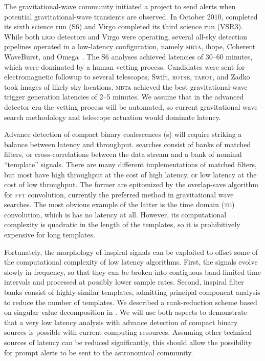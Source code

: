  The gravitational-wave community
initiated a project to send alerts when potential gravitational-wave transients
are observed.  In October 2010, \LIGO{} completed its sixth science run
(S6) and Virgo completed its third science run (VSR3).  While both
\textsc{ligo} detectors and Virgo were operating, several all-sky detection
pipelines operated in a low-latency configuration, namely \textsc{mbta}, ihope,
Coherent WaveBurst, and Omega~\cite{HugheyGWPAW2011, S6lowlatency}.
 The S6 analyses
achieved latencies of 30--60 minutes, which were dominated by a human vetting
process. Candidates were sent for electromagnetic followup to several
telescopes; Swift, \textsc{rotse}, \textsc{tarot}, and Zadko~\cite{kanner2008,
HugheyGWPAW2011} took images of likely sky locations.  \textsc{mbta} achieved
the best gravitational-wave trigger generation latencies of 2--5 minutes.  We
assume that in the advanced detector era the vetting process will be automated,
so current gravitational wave search methodology and telescope actuation would
dominate latency.

Advance detection of compact binary coalescences (\CBC{}s) will require striking a balance between latency
and throughput.  \CBC{} searches consist of banks of matched filters, or
cross-correlations between the data stream and a bank of nominal ``template''
signals.  There are many different implementations of matched filters, but most
have high throughput at the cost of high latency, or low latency at the cost of
low throughput.  The former are epitomized by the overlap-save algorithm for
\textsc{fft} convolution, currently the preferred method in gravitational wave
searches.  The most obvious example of the latter is the time domain
(\textsc{td}) convolution, which is has no latency at all.  However, its
computational complexity is quadratic in the length of the templates, so it is
prohibitively expensive for long templates.

Fortunately, the morphology of inspiral signals can be exploited to offset some
of the computational complexity of low latency algorithms.  First, the signals
evolve slowly in frequency, so that they can be broken into contiguous
band-limited time intervals and processed at possibly lower sample rates.
Second, inspiral filter banks consist of highly similar templates, admitting
principal component analysis to reduce the number of templates.  We described a
rank-reduction scheme based on singular value decomposition in
\cite{Cannon:2010p10398}.  We will use both aspects to demonstrate that a very
low latency analysis with advance detection of compact binary sources is
possible with current computing resources.  Assuming other technical sources of
latency can be reduced significantly, this should allow the possibility for
prompt alerts to be sent to the astronomical community.

